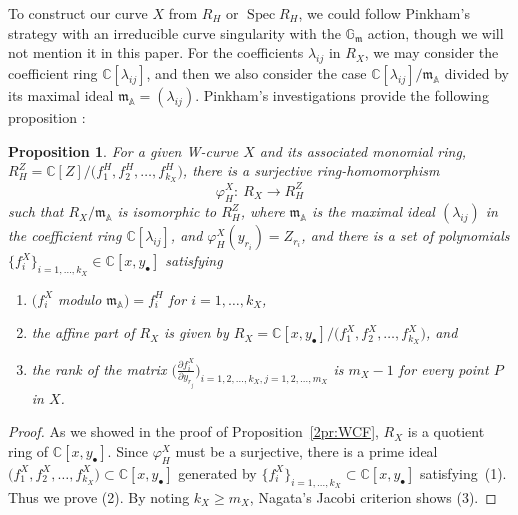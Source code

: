 \documentclass[pdftex]{sigma}
\def\bA{{\mathbb A}}
\def\CC{{\mathbb C}}
\def\GG{{\mathbb G}}
\def\fm{{\mathfrak m}}
\def\Spec{\operatorname{Spec}}
\numberwithin{equation}{section}
\newtheorem{Proposition}[Theorem]{Proposition}
 { \theoremstyle{definition}
\newtheorem{Definition}[Theorem]{Definition}
\newtheorem{Note}[Theorem]{Note}
\newtheorem{Example}[Theorem]{Example}
\newtheorem{Remark}[Theorem]{Remark} }
\begin{document}
To construct our curve $X$ from $R_H$ or $\Spec R_H$, we could follow Pinkham's strategy \cite{Pinkham74} with an irreducible curve singularity with the $\GG_\fm$ action, though we will not mention it in this paper.
For the coefficients $\lambda_{ij}$ in $R_X$, we may consider the coefficient ring $\CC[\lambda_{ij}]$, and then we also consider the case $\CC[\lambda_{ij}]/\fm_{\bA}$ divided by its maximal ideal $\fm_{\bA}=(\lambda_{ij})$.
Pinkham's investigations provide the following proposition \cite{Pinkham74}:
\begin{Proposition} \label{2pr:R_H^Z}
For a given W-curve $X$ and its associated monomial ring,
$R_H^Z = \CC[Z]/ \big(f^H_1, \allowbreak f^H_2, \dots, f^H_{k_X}\big)$, there is a surjective ring-homomorphism {\rm \cite[p.~80]{ADGS2016}}
\[
\varphi^X_H\colon\ R_X \to R_H^Z
\]
such that $R_X/\fm_{\bA}$ is isomorphic to $R_H^Z$, where $\fm_{\bA}$ is the maximal ideal $(\lambda_{ij})$ in the coefficient ring $\CC[\lambda_{ij}]$, and $\varphi^X_H(y_{r_i})=Z_{r_i}$, and there is a set of polynomials $\{f^{X}_i\}_{i = 1, \dots, k_X}\in \CC[x,y_\bullet]$ satisfying
\begin{enumerate}\itemsep=0pt
\item[$(1)$] $\big(f^X_i$ modulo $\fm_{\bA}\big)=f^H_i$ for $i=1,\dots,k_X$,

\item[$(2)$]
the affine part of $R_X$ is given by $R_X=\CC[x,y_{\bullet}]/\big(f^X_1, f^X_2, \dots, f^X_{k_X}\big)$, and

\item[$(3)$] the rank of the matrix
$\big(\frac{\partial f^X_i}{\partial y_{r_j}}\big)_{
i=1, 2, \dots, k_X, j = 1, 2, \dots, m_X}$ is $m_X-1$ for every point $P$ in $X$.
\end{enumerate}
\end{Proposition}

\begin{proof}As we showed in the proof of Proposition~\ref{2pr:WCF}, $R_X$ is a quotient ring of $\CC[x,y_{\bullet}]$.
Since $\varphi_H^X$ must be a surjective, there is a prime ideal $\big(f^X_1, f^X_2, \dots, f^X_{k_X}\big)\subset \CC[x,y_\bullet]$ generated by $\big\{f^{X}_i\big\}_{i = 1, \dots, k_X}\subset \CC[x,y_\bullet]$ satisfying~(1).
Thus we prove (2).
By noting $k_X\ge m_X$, Nagata's Jacobi criterion \cite[Theorem~30.10]{Matsumura} shows (3).
\end{proof}
\end{document}
